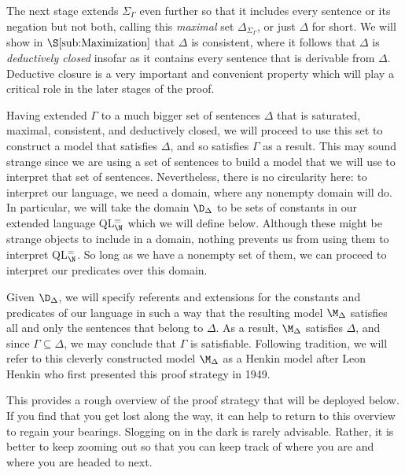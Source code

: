 The next stage extends $\Sigma_\Gamma$ even further so that it includes every sentence or its negation but not both, calling this \textit{maximal} set $\Delta_{\Sigma_\Gamma}$, or just $\Delta$ for short. 
We will show in $\S\ref{sub:Maximization}$ that $\Delta$ is consistent, where it follows that $\Delta$ is \textit{deductively closed} insofar as it contains every sentence that is derivable from $\Delta$.
Deductive closure is a very important and convenient property which will play a critical role in the later stages of the proof.

Having extended $\Gamma$ to a much bigger set of sentences $\Delta$ that is saturated, maximal, consistent, and deductively closed, we will proceed to use this set to construct a model that satisfies $\Delta$, and so satisfies $\Gamma$ as a result. 
This may sound strange since we are using a set of sentences to build a model that we will use to interpret that set of sentences.
Nevertheless, there is no circularity here: to interpret our language, we need a domain, where any nonempty domain will do.
In particular, we will take the domain $\D_\Delta$ to be sets of constants in our extended language QL$^=_{\N}$ which we will define below.
Although these might be strange objects to include in a domain, nothing prevents us from using them to interpret QL$^=_{\N}$.
So long as we have a nonempty set of them, we can proceed to interpret our predicates over this domain.

Given $\D_{\Delta}$, we will specify referents and extensions for the constants and predicates of our language in such a way that the resulting model $\M_\Delta$ satisfies all and only the sentences that belong to $\Delta$.
As a result, $\M_\Delta$ satisfies $\Delta$, and since $\Gamma\subseteq\Delta$, we may conclude that $\Gamma$ is satisfiable. 
Following tradition, we will refer to this cleverly constructed model $\M_\Delta$ as a Henkin model after Leon Henkin who first presented this proof strategy in 1949.

This provides a rough overview of the proof strategy that will be deployed below.
If you find that you get lost along the way, it can help to return to this overview to regain your bearings.
Slogging on in the dark is rarely advisable.
Rather, it is better to keep zooming out so that you can keep track of where you are and where you are headed to next.







